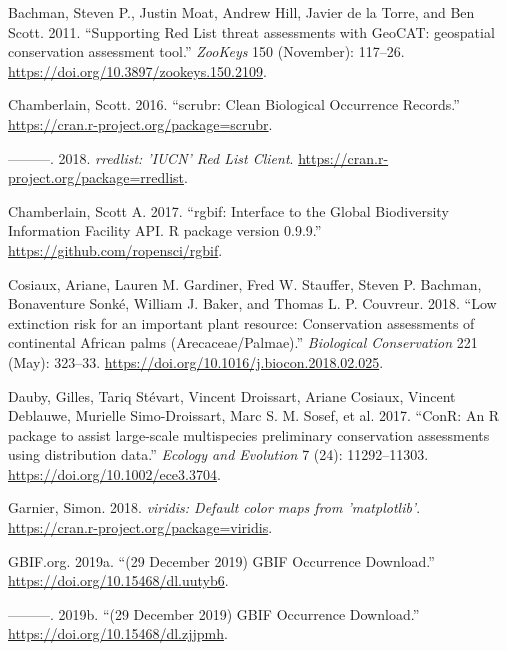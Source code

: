 \documentclass[fleqn,10pt,lineno]{wlpeerj} %
\providecommand{\DIFaddtex}[1]{{\protect\color{blue}\uwave{#1}}} %
\providecommand{\DIFaddbegin}{} %
\providecommand{\DIFaddend}{} %
\providecommand{\DIFdelbegin}{} %
\providecommand{\DIFdelend}{} %
\providecommand{\DIFadd}[1]{\texorpdfstring{\DIFaddtex{#1}}{#1}} %
\begin{document}
\leavevmode\hypertarget{ref-Bachman2011}{}%
Bachman, Steven P., Justin Moat, Andrew Hill, Javier de la Torre, and Ben Scott. 2011. ``Supporting Red List threat assessments with GeoCAT: geospatial conservation assessment tool.'' \emph{ZooKeys} 150 (November): 117--26. \url{https://doi.org/10.3897/zookeys.150.2109}.

\leavevmode\hypertarget{ref-Chamberlain2016}{}%
Chamberlain, Scott. 2016. ``scrubr: Clean Biological Occurrence Records.'' \url{https://cran.r-project.org/package=scrubr}.

\leavevmode\hypertarget{ref-Chamberlain2018}{}%
---------. 2018. \emph{rredlist: 'IUCN' Red List Client}. \url{https://cran.r-project.org/package=rredlist}.

\leavevmode\hypertarget{ref-Chamberlain2017}{}%
Chamberlain, Scott A. 2017. ``rgbif: Interface to the Global Biodiversity Information Facility API. R package version 0.9.9.'' \url{https://github.com/ropensci/rgbif}.

\leavevmode\hypertarget{ref-Cosiaux2018}{}%
Cosiaux, Ariane, Lauren M. Gardiner, Fred W. Stauffer, Steven P. Bachman, Bonaventure Sonké, William J. Baker, and Thomas L. P. Couvreur. 2018. ``Low extinction risk for an important plant resource: Conservation assessments of continental African palms (Arecaceae/Palmae).'' \emph{Biological Conservation} 221 (May): 323--33. \url{https://doi.org/10.1016/j.biocon.2018.02.025}.

\leavevmode\hypertarget{ref-Dauby2017}{}%
Dauby, Gilles, Tariq Stévart, Vincent Droissart, Ariane Cosiaux, Vincent Deblauwe, Murielle Simo-Droissart, Marc S. M. Sosef, et al. 2017. ``ConR: An R package to assist large-scale multispecies preliminary conservation assessments using distribution data.'' \emph{Ecology and Evolution} 7 (24): 11292--11303. \url{https://doi.org/10.1002/ece3.3704}.

\leavevmode\hypertarget{ref-Garnier2018}{}%
Garnier, Simon. 2018. \emph{viridis: Default color maps from 'matplotlib'}. \url{https://cran.r-project.org/package=viridis}.

\leavevmode\DIFdelbegin %
\DIFdelend \DIFaddbegin \hypertarget{ref-GBIForg2019c}{}\DIFaddend %
GBIF.org. 2019a. ``\DIFaddbegin \DIFadd{Arhynchobatidae }\DIFaddend (29 December 2019) GBIF Occurrence Download.'' \DIFdelbegin %
\DIFdelend \DIFaddbegin \url{https://doi.org/10.15468/dl.uutyb6}\DIFaddend .

\leavevmode\DIFdelbegin %
\DIFdelend \DIFaddbegin \hypertarget{ref-GBIForg2019f}{}\DIFaddend %
---------. 2019b. ``\DIFaddbegin \DIFadd{Conchocarpus }\DIFaddend (29 December 2019) GBIF Occurrence Download.'' \DIFdelbegin %
\DIFdelend \DIFaddbegin \url{https://doi.org/10.15468/dl.zjjpmh}\DIFaddend .
\end{document}
